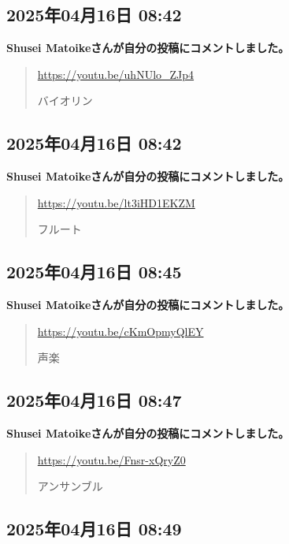 \subsection*{2025年04月16日 08:42}

\textbf{Shusei Matoikeさんが自分の投稿にコメントしました。}

\begin{quote}
\url{https://youtu.be/uhNUlo_ZJp4}

バイオリン
\end{quote}

\subsection*{2025年04月16日 08:42}

\textbf{Shusei Matoikeさんが自分の投稿にコメントしました。}

\begin{quote}
\url{https://youtu.be/lt3iHD1EKZM}

フルート
\end{quote}

\subsection*{2025年04月16日 08:45}

\textbf{Shusei Matoikeさんが自分の投稿にコメントしました。}

\begin{quote}
\url{https://youtu.be/cKmOpmyQlEY}

声楽
\end{quote}

\subsection*{2025年04月16日 08:47}

\textbf{Shusei Matoikeさんが自分の投稿にコメントしました。}

\begin{quote}
\url{https://youtu.be/Fnsr-xQryZ0}

アンサンブル
\end{quote}

\subsection*{2025年04月16日 08:49}

